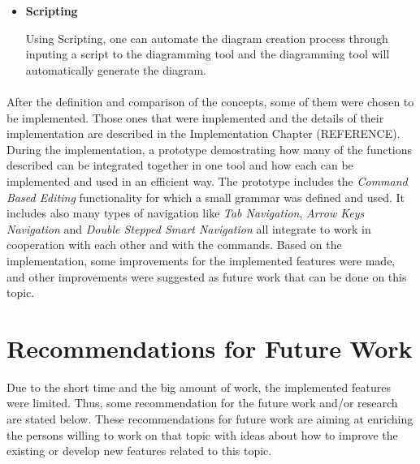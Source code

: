 \begin{itemize}
\begin{itemize}
	\item {\bf Scripting}
	\par \noindent
	Using Scripting, one can automate the diagram creation process through inputing a script to the diagramming tool and the diagramming tool will automatically generate the diagram.
\end{itemize}

\end{itemize}

\paragraph{}
After the definition and comparison of the concepts, some of them were chosen to be implemented. Those ones that were implemented and the details of their implementation are described in the Implementation Chapter (REFERENCE). During the implementation, a prototype demostrating how many of the functions described can be integrated together in one tool and how each can be implemented and used in an efficient way. The prototype includes the {\em Command Based Editing} functionality for which a small grammar was defined and used. It includes also many types of navigation like {\em Tab Navigation}, {\em Arrow Keys Navigation} and {\em Double Stepped Smart Navigation} all integrate to work in cooperation with each other and with the commands. Based on the implementation, some improvements for the implemented features were made, and other improvements were suggested as future work that can be done on this topic.


\section{Recommendations for Future Work}
Due to the short time and the big amount of work, the implemented features were limited. Thus, some recommendation for the future work and/or research are stated below. These recommendations for future work are aiming at enriching the persons willing to work on that topic with ideas about how to improve the existing or develop new features related to this topic.

